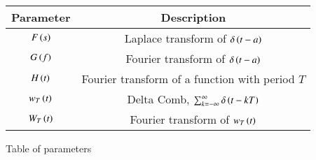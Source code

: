 \renewcommand\thetable{1}
\begin{tabular}{|c|c|}
    \hline 
    \textbf{Parameter}&\textbf{Description} \\
    \hline
    $F\left(s\right)$ & Laplace transform of $\delta\left(t - a\right)$ \\
    \hline
    $G\left(f\right)$ & Fourier transform of $\delta\left(t - a\right)$ \\
    \hline
    $H\left(t\right)$ & Fourier transform of a function with period $T$ \\
    \hline
    $w_T\left(t\right)$ & Delta Comb, $\sum_{k = -\infty}^{\infty}\delta\left(t - kT\right)$ \\
    \hline
    $W_T\left(t\right)$ & Fourier transform of $w_T\left(t\right)$ \\
    \hline
\end{tabular}

\caption{Table of parameters}
\label{Table:2022.ME.3.1}

